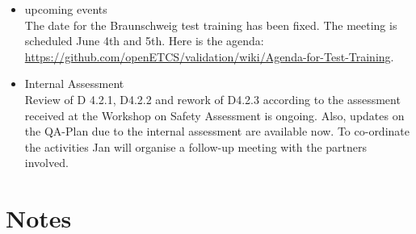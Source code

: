 \documentclass[a4paper, 11pt]{article}
\begin{document}
\begin{itemize}
\item upcoming events\\
The date for the Braunschweig test training has been fixed. The meeting is scheduled June 4th and 5th. Here is the agenda: \url{https://github.com/openETCS/validation/wiki/Agenda-for-Test-Training}.

\item Internal Assessment\\
Review of D 4.2.1, D4.2.2 and rework of D4.2.3 according to the assessment received at the Workshop on Safety Assessment is ongoing. Also, updates on the QA-Plan due to the internal assessment  are available now. To co-ordinate the activities Jan will organise a follow-up meeting with the partners involved.

\end{itemize}

\section{Notes}
\end{document}
